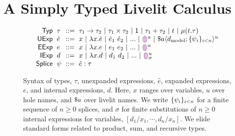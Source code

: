 \section{A Simply Typed Livelit Calculus}\label{sec:livelit-calculus}

\begin{figure}
    \[
    \arraycolsep=3pt\begin{array}{rlcl}
        \mathsf{Typ} & \tau & ::= &
                                    \tarr{\tau_1}{\tau_2} ~\vert~
                                    \tprod{\tau_1}{\tau_2} ~\vert~
                                    \tunit ~\vert~
                                    \tsum{\tau_1}{\tau_2} ~\vert~
                                    t ~\vert~
                                    \trec{t}{\tau}\\
        \mathsf{UExp} & \hat{e} & ::= & 
                                 x ~\vert~
                                 \hlam{x}{\hat e} ~\vert~
                                 \hap{\hat e_1}{\hat e_2} ~\vert~
                                 ... ~\vert~
                                 \hehole{u} ~\vert~
                                 \haplivelit{u}{a}{\dtxt{model}}{\splices}\\
        \mathsf{EExp} & e & ::= & x ~\vert~ \hlam{x}{e} ~\vert~ \hap{e_1}{e_2} ~\vert~ ... ~\vert~ \hehole{u}\\
        \mathsf{IExp} & d & ::= & x ~\vert~ \hlam{x}{d} ~\vert~ \hap{d_1}{d_2} ~\vert~ ... ~\vert~ \dehole{u}{\sigma}\\
        \mathsf{Splice} & \psi & ::= & \hsplice{\hat e}{\tau}
    \end{array}
    \]
    \caption{Syntax of types, $\tau$, unexpanded expressions, $\hat{e}$, expanded expressions, $e$, and internal expressions, $d$.
    Here, $x$ ranges over variables, $u$ over hole names, and $\$a$ over livelit names.
    We write $\{\psi_i\}_{i < n}$ for a finite sequence of $n \geq 0$ splices,
    and $\sigma$ for finite substitutions of $n \geq 0$ internal expressions for variables, $[d_1/x_1, \cdots, d_n/x_n]$.
    We elide standard forms
    related to product, sum, and recursive types.
    }
    \label{fig:syntax}
    \end{figure}

